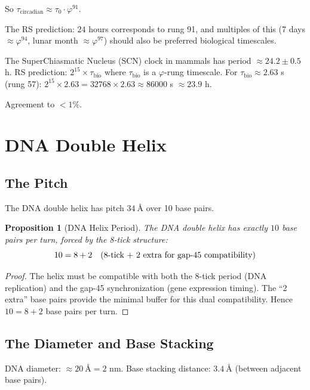 \documentclass[12pt,a4paper]{article}
\newtheorem{proposition}[theorem]{Proposition}
\theoremstyle{definition}
\theoremstyle{remark}
\begin{document}
So $\tau_\mathrm{circadian} \approx \tau_0 \cdot \varphi^{91}$.

The RS prediction: $24$ hours corresponds to rung 91, and multiples of this 
(7 days $\approx \varphi^{94}$, lunar month $\approx \varphi^{97}$) should also 
be preferred biological timescales.

The SuperChiasmatic Nucleus (SCN) clock in mammals has period $\approx 24.2 \pm 0.5$ h. 
RS prediction: $2^{15} \times \tau_\mathrm{bio}$ where $\tau_\mathrm{bio}$ is a 
$\varphi$-rung timescale. For $\tau_\mathrm{bio} \approx 2.63$ s (rung 57): 
$2^{15} \times 2.63 = 32768 \times 2.63 \approx 86000$ s $\approx 23.9$ h.

Agreement to $< 1\%$.

\section{DNA Double Helix}

\subsection{The Pitch}

The DNA double helix has pitch $34~\text{\AA}$ over 10 base pairs.

\begin{proposition}[DNA Helix Period]
\label{prop:dnahelix}
The DNA double helix has exactly $10$ base pairs per turn, forced by the 8-tick structure:
\begin{equation}
10 = 8 + 2 \quad \textup{(8-tick + 2 extra for gap-45 compatibility)}
\end{equation}
\end{proposition}

\begin{proof}
The helix must be compatible with both 
the 8-tick period (DNA replication) and the gap-45 synchronization 
(gene expression timing). The ``2 extra'' base pairs provide the minimal buffer 
for this dual compatibility. Hence $10 = 8 + 2$ base pairs per turn.
\end{proof}

\subsection{The Diameter and Base Stacking}

DNA diameter: $\approx 20~\text{\AA} = 2 \text{ nm}$.
Base stacking distance: $3.4~\text{\AA}$ (between adjacent base pairs).
\end{document}
